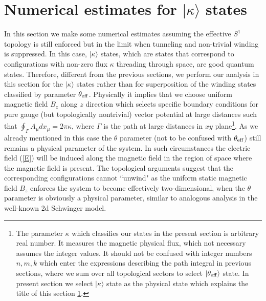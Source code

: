 \documentclass[ twocolumn,aps,prd,   
               preprintnumbers,numbers,sort&compress,nofootinbib,
                            showpacs,superscriptaddress,
               colorlinks,
               linkcolor=blue,   
               citecolor=blue]{revtex4-1}   \newcommand{\exclude}[1]{}
\def\ra{\rangle}
\begin{document}
\section{Numerical estimates for $|\kappa\ra$ states  }\label{winding} 
In this section we make some numerical estimates assuming the effective $S^1$ topology is still enforced but in the limit when tunneling and non-trivial winding is suppressed. In this case, $|\kappa\rangle$ states, which are states that correspond to configurations with non-zero flux $\kappa$ threading through space, are good quantum states. Therefore, different from the previous sections, we   perform our analysis in this section for the   $|\kappa\ra$ states rather than for  superposition of the winding states classified 
by parameter $\theta_{\rm eff}$. Physically it implies that we choose uniform magnetic field $B_z$ along $z$ direction 
which selects specific boundary conditions for pure gauge (but topologically nontrivial) vector potential at large distances
such that $\oint_{\Gamma} A_{\mu} dx_{\mu}=2\pi \kappa$, where $\Gamma$ is the path at large distances in $xy$ plane\footnote{The parameter $\kappa$ which classifies our states in the present section is arbitrary real  number. It measures the magnetic physical flux, which   not necessary assumes the  integer values.  It  should not be confused with integer numbers $n, m, k$ which enter the expressions describing the path integral in previous sections, where we sum over all topological sectors to select $|\theta_{\rm eff}\rangle$ state. In present section we select $|\kappa\rangle$ state as the physical state which explains the title of this section \ref{winding}. }.  As we already mentioned in this case   the $\theta$ parameter (not to be confused with $\theta_{\rm eff}$) still remains a physical parameter of the system. 
In such circumstances the electric field (\ref{E}) will be induced along the magnetic field  in the region of  space where the magnetic field is present.   
The topological arguments suggest that the corresponding configurations cannot  ``unwind" as the uniform static magnetic field $B_z$    enforces the system to become effectively two-dimensional, when the $\theta$ parameter is obviously a physical parameter,  similar to analogous analysis  in the well-known  2d Schwinger  model. 
\end{document}
